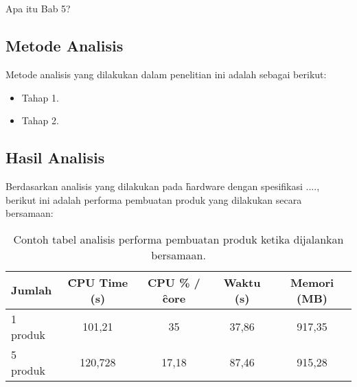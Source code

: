 \chapter{\babLima}
\label{bab:5}
Apa itu Bab 5?



\section{Metode Analisis}
\label{sec:method}
Metode analisis yang dilakukan dalam penelitian ini adalah sebagai berikut:
\begin{itemize}
	\item Tahap 1.
	\item Tahap 2.
\end{itemize}


\section{Hasil Analisis}
\label{sec:analisis}
Berdasarkan analisis yang dilakukan pada \f{hardware} dengan spesifikasi ...., berikut ini adalah performa pembuatan produk yang dilakukan secara bersamaan:
\begin{table}
	\centering
	\begin{tabular}{|l|c|c|c|c|}
		\hline
		Jumlah   & \f{CPU Time} (s) & CPU \% / \f{core} & Waktu (s) & Memori (MB) \\ \hline
		1 produk & 101,21           & 35                & 37,86     & 917,35      \\ \hline
		5 produk & 120,728          & 17,18             & 87,46     & 915,28      \\ \hline
	\end{tabular}
	\caption{Contoh tabel analisis performa pembuatan produk ketika dijalankan bersamaan.}
	\label{table:sample}
\end{table}

